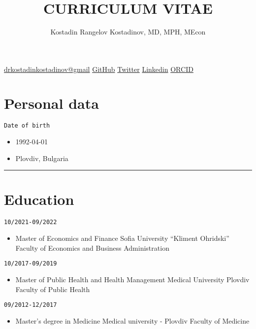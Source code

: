 \documentclass[
  12pt,
  letterpaper,
  DIV=11,
  numbers=noendperiod]{scrartcl}
\title{CURRICULUM VITAE}
\author{Kostadin Rangelov Kostadinov, MD, MPH, MEcon}
\date{}
\providecommand{\tightlist}{%
  \setlength{\itemsep}{0pt}\setlength{\parskip}{0pt}}\usepackage{longtable,booktabs,array}
\begin{document}
\maketitle


\href{https://drkostadinkostadinov@gmail.com}{drkostadinkostadinov@gmail}
\textbar{} \href{https://github.com/kostadinoff}{GitHub} \textbar{}
\href{https://twitter.com/kostadinoffMD}{Twitter} \textbar{}
\href{https://linkedin.com/in/kostadinovmd}{Linkedin} \textbar{}
\href{https://orcid.org/0000-0003-1414-8738}{ORCID}

\section{Personal data}\label{personal-data}

\texttt{Date\ of\ birth}

\begin{itemize}
\tightlist
\item
  1992-04-01
\item
  Plovdiv, Bulgaria
\end{itemize}

\begin{center}\rule{0.5\linewidth}{0.5pt}\end{center}

\section{Education}\label{education}

\texttt{10/2021-09/2022}

\begin{itemize}
\tightlist
\item
  Master of Economics and Finance \textbar{} Sofia University ``Kliment
  Ohridski'' \textbar{} Faculty of Economics and Business Administration
\end{itemize}

\texttt{10/2017-09/2019}

\begin{itemize}
\tightlist
\item
  Master of Public Health and Health Management \textbar{} Medical
  University Plovdiv \textbar{} Faculty of Public Health
\end{itemize}

\texttt{09/2012-12/2017}

\begin{itemize}
\tightlist
\item
  Master's degree in Medicine \textbar{} Medical university - Plovdiv
  \textbar{} Faculty of Medicine
\end{itemize}
\end{document}
